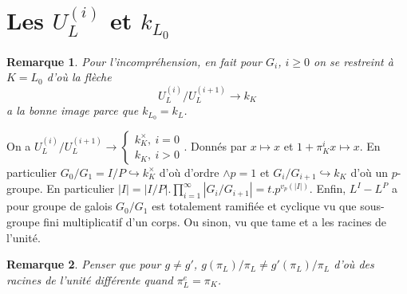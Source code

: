 \documentclass[a4paper,12pt]{book}
\theoremstyle{plain}
\newtheorem{rem}{Remarque}
\theoremstyle{definition}
\theoremstyle{remark}
\begin{document}
\section{Les $U_L^{(i)}$ et $k_{L_0}$}
\begin{rem}
    Pour l'incompréhension, en fait pour $G_i$, $i\geq 0$
    on se restreint à $K=L_0$ d'où la flèche
    \[U_L^{(i)}/U_L^{(i+1)}\to k_{K}\]
    a la bonne image parce que $k_{L_0}=k_L$.
\end{rem}
On a $U_L^{(i)}/U_L^{(i+1)}\to
\begin{cases}k_K^\times,~i=0\\ k_K,~i>0\end{cases}$. Donnés par
$x\mapsto x$ et $1+\pi_K^ix\mapsto x$. En particulier
$G_0/G_1=I/P\hookrightarrow k_K^\times$ d'où d'ordre $\wedge p=1$
et $G_i/G_{i+1}\hookrightarrow k_K$ d'où un $p$-groupe. En 
particulier 
$|I|=|I/P|.\prod_{i=1}^\infty |G_i/G_{i+1}|=t.p^{v_p(|I|)}$.
Enfin, $L^I-L^P$ a pour groupe de galois $G_0/G_1$ est totalement
ramifiée et cyclique vu que sous-groupe fini multiplicatif d'un
corps. Ou sinon, vu que tame et a les racines de l'unité. 
\begin{rem}
    Penser que pour $g\ne g'$, $g(\pi_L)/\pi_L\ne g'(\pi_L)/\pi_L$
    d'où des racines de l'unité différente quand
    $\pi_L^e=\pi_K$.
\end{rem}
\end{document}
